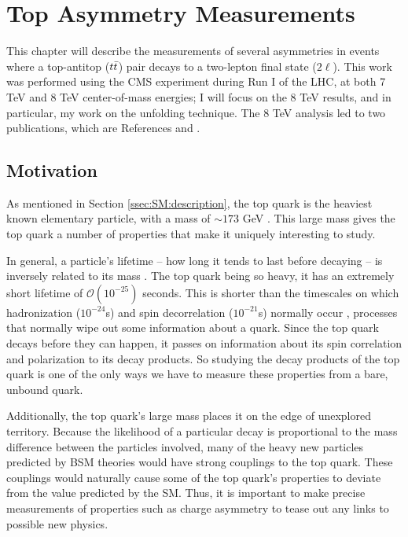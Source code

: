 \chapter{Top Asymmetry Measurements}
\label{chap:afb}

This chapter will describe the measurements of several asymmetries in
events where a top-antitop ($t\bar{t}$) pair decays to a two-lepton
final state ($2\ell$). This work was performed using the CMS
experiment during Run I of the LHC, at both 7 TeV and 8 TeV
center-of-mass energies;
I will focus on the 8 TeV results, and in particular, my work on the
unfolding technique. The 8 TeV analysis led to two publications, which
are References \cite{chargeasym} and \cite{spincorrpol}.


\section{Motivation}
\label{sec:afb:motivation}

As mentioned in Section \ref{ssec:SM:description}, the top quark is the
heaviest known elementary particle, with a mass of $\sim 173$ GeV
\cite{pdg}. This large mass gives the top quark a number of properties
that make it uniquely interesting to study.

In general, a particle's lifetime -- how long it tends to last before
decaying -- is inversely related to its mass \cite{griffiths}.
The top quark being so heavy, it has an extremely short lifetime
of $\mathcal{O} (10^{-25})$ seconds. This is shorter than the timescales on
which hadronization ($10^{-24}$s) and spin decorrelation ($10^{-21}$s)
normally occur \cite{pdg,spindecorrelation}, processes that normally
wipe out some information about a quark. Since the top quark decays
before they can happen, it passes on information about its spin
correlation and polarization to its decay products. So studying the decay
products of the top quark is one of the only ways we have to measure
these properties from a bare, unbound quark.

Additionally, the top quark's large mass places it on the edge of
unexplored territory. Because the likelihood of a particular decay is
proportional to the mass difference between the particles involved,
many of the heavy new particles predicted by BSM theories would have strong
couplings to the top quark.
These couplings would naturally cause some of the top quark's
properties to deviate from the value predicted by the SM. Thus, it is
important to make precise measurements of properties such as charge
asymmetry to tease out any links to possible new physics.

